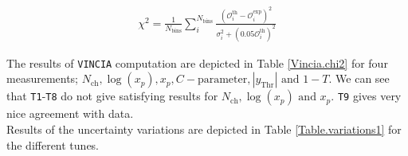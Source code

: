 \documentclass[aps,preprint,floatfix,nofootinbib,showpacs]{revtex4-1}
\begin{document}
\begin{eqnarray}
 \chi^2 = \frac{1}{N_\textrm{bins}} \sum_i^{N_\textrm{bins}} \frac{(\mathcal{O}_i^\textrm{th} - \mathcal{O}_i^\textrm{exp})^2}
 {\sigma^2_i + (0.05  \mathcal{O}_i^\textrm{th})^2}
 \label{chi2}
\end{eqnarray}

The results of \texttt{VINCIA} computation
are depicted in Table \ref{Vincia.chi2} for four
measurements; $N_\textrm{ch}, \log(x_p), x_p, C-\textrm{parameter}, 
|y_\textrm{Thr}| \text{ and }  1- T$.
We can see that \texttt{T1}-\texttt{T8} do not give satisfying results
for $N_\textrm{ch}, \log(x_p) \text{ and } x_p$. \texttt{T9}
gives very nice agreement with data. \\

Results of the uncertainty variations are depicted in Table \ref{Table.variations1}
for the different tunes.
\end{document}
